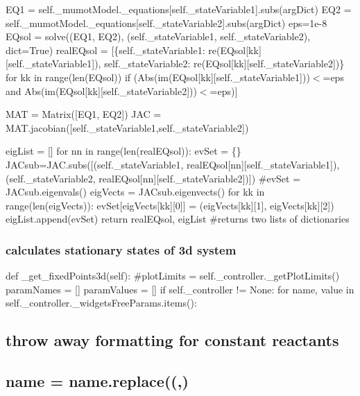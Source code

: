 E\+Q1 = self.\+\_\+mumot\+Model.\+\_\+equations\mbox{[}self.\+\_\+state\+Variable1\mbox{]}.subs(arg\+Dict) E\+Q2 = self.\+\_\+mumot\+Model.\+\_\+equations\mbox{[}self.\+\_\+state\+Variable2\mbox{]}.subs(arg\+Dict) eps=1e-\/8 E\+Qsol = solve((E\+Q1, E\+Q2), (self.\+\_\+state\+Variable1, self.\+\_\+state\+Variable2), dict=True) real\+E\+Qsol = \mbox{[}\{self.\+\_\+state\+Variable1\+: re(E\+Qsol\mbox{[}kk\mbox{]}\mbox{[}self.\+\_\+state\+Variable1\mbox{]}), self.\+\_\+state\+Variable2\+: re(E\+Qsol\mbox{[}kk\mbox{]}\mbox{[}self.\+\_\+state\+Variable2\mbox{]})\} for kk in range(len(\+E\+Qsol)) if (Abs(im(E\+Qsol\mbox{[}kk\mbox{]}\mbox{[}self.\+\_\+state\+Variable1\mbox{]}))$<$=eps and Abs(im(E\+Qsol\mbox{[}kk\mbox{]}\mbox{[}self.\+\_\+state\+Variable2\mbox{]}))$<$=eps)\mbox{]}

M\+AT = Matrix(\mbox{[}\+E\+Q1, E\+Q2\mbox{]}) J\+AC = M\+A\+T.\+jacobian(\mbox{[}self.\+\_\+state\+Variable1,self.\+\_\+state\+Variable2\mbox{]})

eig\+List = \mbox{[}\mbox{]} for nn in range(len(real\+E\+Qsol))\+: ev\+Set = \{\} J\+A\+Csub=J\+A\+C.\+subs(\mbox{[}(self.\+\_\+state\+Variable1, real\+E\+Qsol\mbox{[}nn\mbox{]}\mbox{[}self.\+\_\+state\+Variable1\mbox{]}), (self.\+\_\+state\+Variable2, real\+E\+Qsol\mbox{[}nn\mbox{]}\mbox{[}self.\+\_\+state\+Variable2\mbox{]})\mbox{]}) \#ev\+Set = J\+A\+Csub.\+eigenvals() eig\+Vects = J\+A\+Csub.\+eigenvects() for kk in range(len(eig\+Vects))\+: ev\+Set\mbox{[}eig\+Vects\mbox{[}kk\mbox{]}\mbox{[}0\mbox{]}\mbox{]} = (eig\+Vects\mbox{[}kk\mbox{]}\mbox{[}1\mbox{]}, eig\+Vects\mbox{[}kk\mbox{]}\mbox{[}2\mbox{]}) eig\+List.\+append(ev\+Set) return real\+E\+Qsol, eig\+List \#returns two lists of dictionaries

\subsubsection*{calculates stationary states of 3d system}

def \+\_\+get\+\_\+fixed\+Points3d(self)\+: \#plot\+Limits = self.\+\_\+controller.\+\_\+get\+Plot\+Limits() param\+Names = \mbox{[}\mbox{]} param\+Values = \mbox{[}\mbox{]} if self.\+\_\+controller != None\+: for name, value in self.\+\_\+controller.\+\_\+widgets\+Free\+Params.\+items()\+: \subsection*{throw away formatting for constant reactants}

\subsection*{name = name.\+replace(\textquotesingle{}(\textquotesingle{},\textquotesingle{}\textquotesingle{})}

